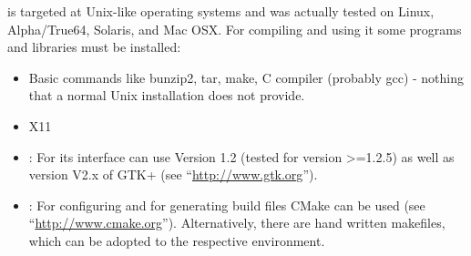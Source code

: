 \icewing{} is targeted at Unix-like operating systems and was
actually tested on Linux, Alpha/True64, Solaris, and Mac OSX. For
compiling and using it some programs and libraries must be
installed:

\begin{itemize}
\item Basic commands like bunzip2, tar, make, C compiler
  (probably gcc) - nothing that a normal Unix installation does not
  provide.
\item X11
\item {}: For its interface \icewing{} can use Version 1.2
  (tested for version \textgreater=1.2.5) as well as version V2.x of
  GTK+ (see ``\url{http://www.gtk.org}'').
\item {}: For configuring and for generating build files
  CMake can be used (see ``\url{http://www.cmake.org}'').
  Alternatively, there are hand written makefiles, which can be
  adopted to the respective environment.
\end{itemize}

